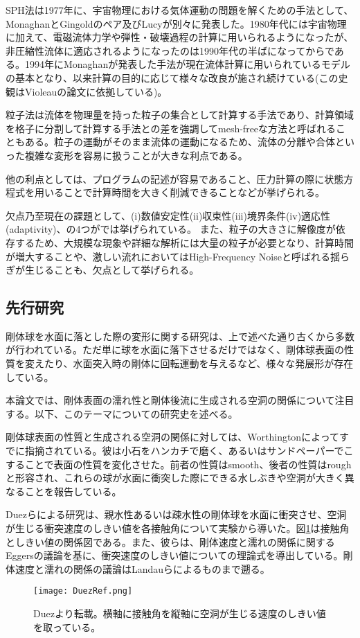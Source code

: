 \documentclass[]{jsarticle}
\begin{document}
SPH法は1977年に、宇宙物理における気体運動の問題を解くための手法として、MonaghanとGingoldのペア\cite{Gingold1977}及びLucy\cite{Lucy1977}が別々に発表した。1980年代には宇宙物理に加えて、電磁流体力学や弾性・破壊過程の計算に用いられるようになったが、非圧縮性流体に適応されるようになったのは1990年代の半ばになってからである。1994年にMonaghan\cite{Monaghan1994}が発表した手法が現在流体計算に用いられているモデルの基本となり、以来計算の目的に応じて様々な改良が施され続けている(この史観はVioleau\cite{Violeau2016}の論文に依拠している)。

粒子法は流体を物理量を持った粒子の集合として計算する手法であり、計算領域を格子に分割して計算する手法との差を強調してmesh-freeな方法と呼ばれることもある。粒子の運動がそのまま流体の運動になるため、流体の分離や合体といった複雑な変形を容易に扱うことが大きな利点である。

他の利点としては、プログラムの記述が容易であること、圧力計算の際に状態方程式を用いることで計算時間を大きく削減できることなどが挙げられる。

欠点乃至現在の課題として、(i)数値安定性(ii)収束性(iii)境界条件(iv)適応性(adaptivity)、の4つが\cite{Violeau2016}では挙げられている。
また、粒子の大きさに解像度が依存するため、大規模な現象や詳細な解析には大量の粒子が必要となり、計算時間が増大することや、激しい流れにおいてはHigh-Frequency Noiseと呼ばれる揺らぎが生じる\cite{Kiara2013}ことも、欠点として挙げられる。

\subsection{先行研究}
剛体球を水面に落とした際の変形に関する研究は、上で述べた通り古くから多数が行われている。ただ単に球を水面に落下させるだけではなく、剛体球表面の性質を変えたり、水面突入時の剛体に回転運動を与えるなど、様々な発展形が存在している。

本論文では、剛体表面の濡れ性と剛体後流に生成される空洞の関係について注目する。以下、このテーマについての研究史を述べる。

剛体球表面の性質と生成される空洞の関係に対しては、Worthingtonによってすでに指摘されている\cite{Worthington1908}。彼は小石をハンカチで磨く、あるいはサンドペーパーでこすることで表面の性質を変化させた。前者の性質はsmooth、後者の性質はroughと形容され、これらの球が水面に衝突した際にできる水しぶきや空洞が大きく異なることを報告している。

Duez\cite{Duez2007}らによる研究は、親水性あるいは疎水性の剛体球を水面に衝突させ、空洞が生じる衝突速度のしきい値を各接触角について実験から導いた。図\ref{fig:DuezRef}は接触角としきい値の関係図である。また、彼らは、剛体速度と濡れの関係に関するEggers\cite{Eggers2004}の議論を基に、衝突速度のしきい値についての理論式を導出している。剛体速度と濡れの関係の議論はLandau\cite{landau1942}らによるものまで遡る。
\begin{figure}[H]
  \centering
  \texttt{[image: DuezRef.png]}
  \caption{Duez\cite{Duez2007}より転載。横軸に接触角を縦軸に空洞が生じる速度のしきい値を取っている。\label{fig:DuezRef} }
\end{figure}
\end{document}

